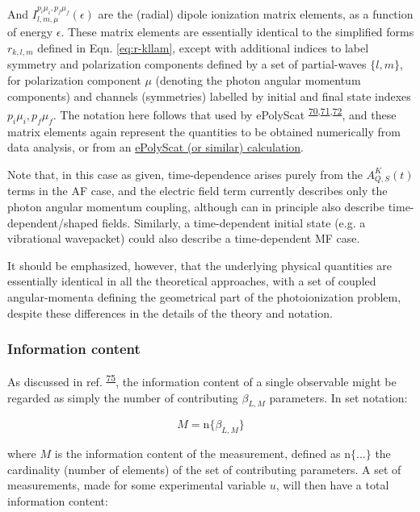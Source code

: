 \documentclass[10pt]{article}
\begin{document}
And \(I_{l,m,\mu}^{p_{i}\mu_{i},p_{f}\mu_{f}}(\epsilon)\) are the (radial) dipole ionization matrix elements, as a function of energy \(\epsilon\). These matrix elements are essentially identical to the simplified forms $r_{k,l,m}$ defined in Eqn. \ref{eq:r-kllam}, except with additional indices to label symmetry and polarization components
defined by a set of partial-waves \(\{l,m\}\), for polarization component \(\mu\) (denoting the photon angular momentum components) and channels (symmetries) labelled by initial and final state indexes \({p_{i}\mu_{i},p_{f}\mu_{f}}\). The notation here follows that used by ePolyScat \textsuperscript{\hyperref[csl:70]{70},\hyperref[csl:71]{71},\hyperref[csl:72]{72}}, and these matrix elements again represent the quantities  to be obtained numerically from data analysis, or from an \href{https://epsproc.readthedocs.io/en/latest/ePS_ePSproc_tutorial/ePS_tutorial_080520.html\#Theoretical-background}{ePolyScat (or similar) calculation}. 

Note that, in this case as given, time-dependence arises purely from the \(A_{Q,S}^{K}(t)\) terms in the AF case, and the electric field term currently describes only the photon angular momentum coupling,
although can in principle also describe time-dependent/shaped fields. Similarly, a time-dependent initial state (e.g. a vibrational wavepacket) could also describe a time-dependent MF case.

It should be emphasized, however, that the underlying physical quantities are essentially identical in all the theoretical approaches, with a set of coupled angular-momenta defining the geometrical part of the photoionization problem, despite these differences in the details of the theory and notation. 




\subsubsection{Information content\label{sec:info-content}}

As discussed in ref. \textsuperscript{\hyperref[csl:75]{75}}, the information content of a single observable might be regarded as simply the number of contributing $\beta_{L,M}$ parameters. In set notation:

\begin{equation}
M=\mathrm{n}\{\beta_{L,M}\}
\end{equation}

where $M$ is the information content of the measurement, defined
as $\mathrm{n}\{...\}$ the cardinality (number of elements) of the
set of contributing parameters. A set of measurements, made for some
experimental variable $u$, will then have a total information content:
\end{document}
